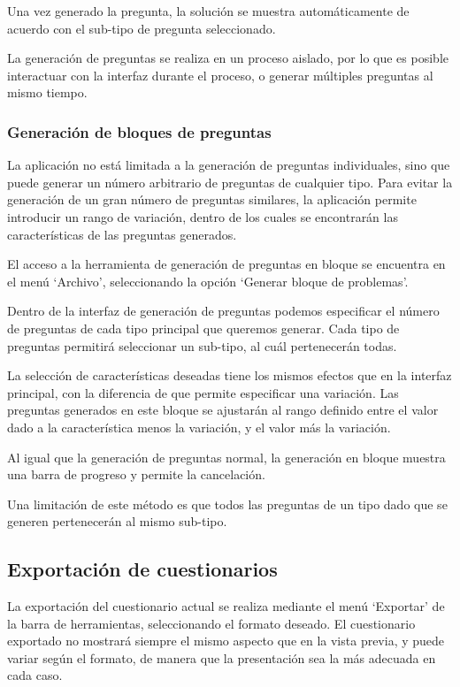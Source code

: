 
Una vez generado la pregunta, la solución se muestra automáticamente de acuerdo con el sub-tipo de pregunta seleccionado.

La generación de preguntas se realiza en un proceso aislado, por lo que es posible interactuar con la interfaz durante el proceso, o generar múltiples preguntas al mismo tiempo.

\subsubsection{Generación de bloques de preguntas}
La aplicación no está limitada a la generación de preguntas individuales, sino que puede generar un número arbitrario de preguntas de cualquier tipo.
Para evitar la generación de un gran número de preguntas similares, la aplicación permite introducir un rango de variación, dentro de los cuales se encontrarán las características de las preguntas generados.

El acceso a la herramienta de generación de preguntas en bloque se encuentra en el menú `Archivo', seleccionando la opción `Generar bloque de problemas'.


Dentro de la interfaz de generación de preguntas podemos especificar el número de preguntas de cada tipo principal que queremos generar.
Cada tipo de preguntas permitirá seleccionar un sub-tipo, al cuál pertenecerán todas.

La selección de características deseadas tiene los mismos efectos que en la interfaz principal, con la diferencia de que permite especificar una variación.
Las preguntas generados en este bloque se ajustarán al rango definido entre el valor dado a la característica menos la variación, y el valor más la variación.


Al igual que la generación de preguntas normal, la generación en bloque muestra una barra de progreso y permite la cancelación.

Una limitación de este método es que todos las preguntas de un tipo dado que se generen pertenecerán al mismo sub-tipo.

\subsection{Exportación de cuestionarios}
La exportación del cuestionario actual se realiza mediante el menú `Exportar' de la barra de herramientas, seleccionando el formato deseado.
El cuestionario exportado no mostrará siempre el mismo aspecto que en la vista previa, y puede variar según el formato, de manera que la presentación sea la más adecuada en cada caso.

